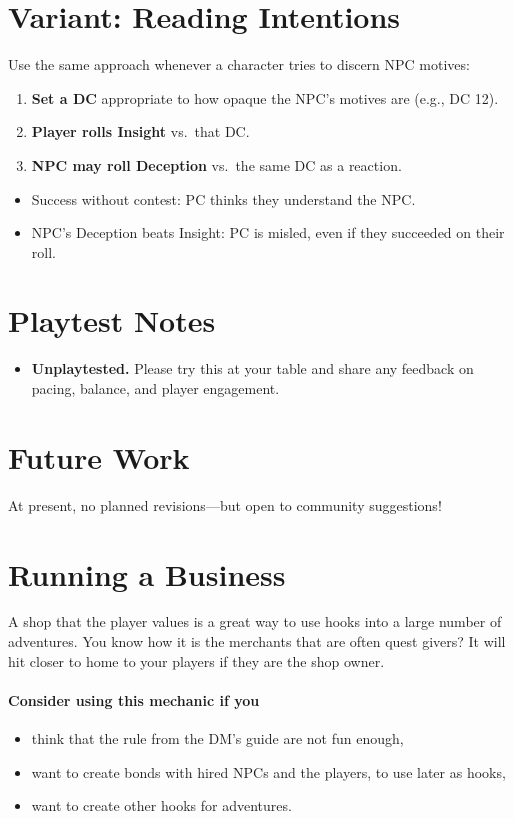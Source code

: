 \documentclass[twocolumn]{dndbook}
\begin{document}
\section{Variant: Reading Intentions}
Use the same approach whenever a character tries to discern NPC motives:
\begin{enumerate}
  \item \textbf{Set a DC} appropriate to how opaque the NPC’s motives are (e.g., DC 12).
  \item \textbf{Player rolls Insight} vs.\ that DC.
  \item \textbf{NPC may roll Deception} vs.\ the same DC as a reaction.
\end{enumerate}
\begin{itemize}
  \item Success without contest: PC thinks they understand the NPC.
  \item NPC’s Deception beats Insight: PC is misled, even if they succeeded on their roll.
\end{itemize}

\section{Playtest Notes}
\begin{itemize}
  \item \textbf{Unplaytested.} Please try this at your table and share any feedback on pacing, balance, and player engagement.
\end{itemize}

\section{Future Work}
At present, no planned revisions—but open to community suggestions!

\section{Running a Business}

\begin{emphasisParagraph}
	A shop that the player values is a great way to use hooks into a large number of adventures.
	You know how it is the merchants that are often quest givers?
	It will hit closer to home to your players if they are the shop owner.
	\paragraph*{Consider using this mechanic if you}
	\begin{itemize}
    \item think that the rule from the DM's guide are not fun enough,
    \item want to create bonds with hired NPCs and the players, to use later as hooks,
    \item want to create other hooks for adventures.
    \end{itemize}
\end{emphasisParagraph}
\end{document}
